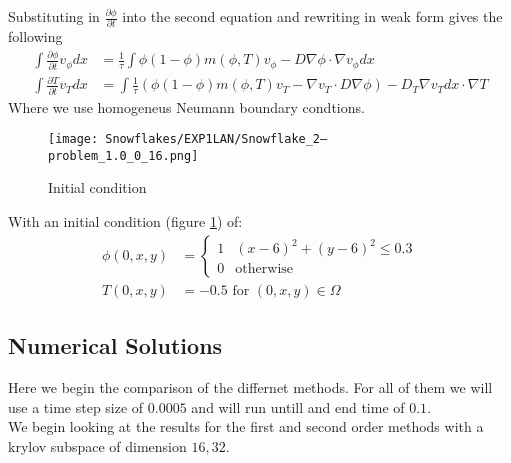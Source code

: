 Substituting in $\frac{\partial \phi}{\partial t}$ into the second equation and rewriting in weak form gives the following
\begin{align*}
    \int \frac{\partial \phi}{\partial t} v_{\phi}dx &=  \frac 1{\tau}\int \phi(1-\phi)m(\phi,T)v_{\phi} - D \nabla \phi \cdot \nabla v_{\phi}dx\\
    \int \frac{\partial T}{\partial t} v_T dx &= \int \frac 1{\tau}(\phi(1-\phi)m(\phi,T)v_T - \nabla v_T \cdot D \nabla \phi) - D_T \nabla v_Tdx \cdot \nabla T
\end{align*}
Where we use homogeneus Neumann boundary condtions.
\begin{figure}[H]
    \centering
    \texttt{[image: Snowflakes/EXP1LAN/Snowflake\_2--problem\_1.0\_0\_16.png]} %
    \caption{Initial condition}
    \label{fig:initial}
\end{figure}
With an initial condition (figure \ref{fig:initial}) of: 
\begin{align*}
    \phi(0,x,y) &= \begin{cases} 
      1 & (x - 6)^2 + (y - 6)^2 \leq 0.3 \\
      0 & \text{otherwise} \end{cases}\\
    T(0,x,y) &= -0.5 \text{  for  } (0,x,y)\in \Omega
\end{align*}

\subsection{Numerical Solutions}
Here we begin the comparison of the differnet methods.
For all of them we will use a time step size of $0.0005$ and will run untill and end time of $0.1$.\\

We begin looking at the results for the first and second order methods with a krylov subspace of dimension $16, 32$.

